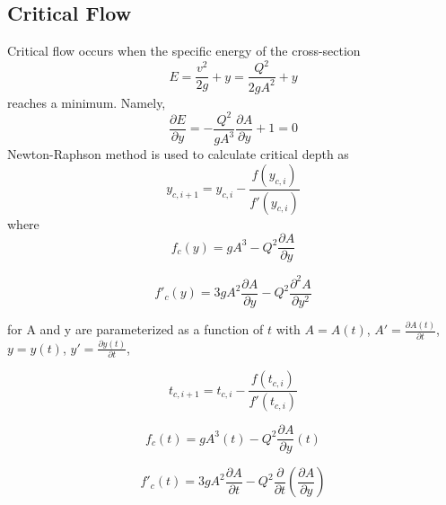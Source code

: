 \subsection{Critical Flow}
Critical flow occurs when the specific energy of the cross-section
\begin{equation}
E = \frac{v^2}{2g} + y =\frac{Q^2}{2gA^2} + y 
\end{equation}
reaches a minimum. Namely,
\begin{equation}
\frac{\partial E}{\partial y} =  -\frac{Q^2}{gA^3}\frac{\partial A}{\partial y} + 1 = 0
\end{equation}
Newton-Raphson method is used to calculate critical depth as
\begin{equation}  
y_{c,i+1} = y_{c,i} -\frac{f(y_{c,i})}{f'(y_{c,i})}
\end{equation}
where
\begin{equation}  
f_c(y)= gA^3 - Q^2\frac{\partial A}{\partial y} 
\end{equation}

\begin{equation}  
f'_c(y)= 3gA^2\frac{\partial A}{\partial y} - Q^2\frac{\partial ^2A}{\partial y^2} 
\end{equation}



for A and y are parameterized as a function of $t$ with $A=A(t)$, $A'=\frac{\partial A(t)} {\partial t}$, $y=y(t)$, $y'=\frac{\partial y(t)}{\partial t}$, 

\begin{equation}  
t_{c,i+1} = t_{c,i} -\frac{f(t_{c,i})}{f'(t_{c,i})}
\end{equation}

\begin{equation}  
f_c(t)= gA^3(t) - Q^2\frac{\partial A}{\partial y}(t) 
\end{equation}

\begin{equation}  
f'_c(t)= 3gA^2\frac{\partial A}{\partial t} - Q^2\frac{\partial}{\partial t}\left(\frac{\partial A}{\partial y}\right) 
\end{equation}





